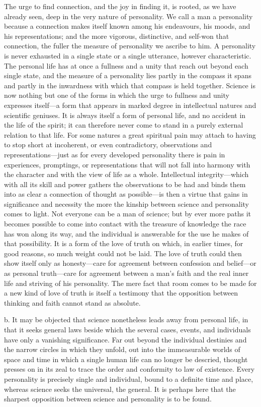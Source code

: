 \documentclass[12pt,a4paper]{article}
\newcommand{\opage}[1]{\marginnote{\footnotesize\textit{[#1]}}}
\begin{document}
The urge to find connection, and the joy in finding it, is rooted, as we have
already seen, deep in the very nature of personality. We call a man a personality
because a connection makes itself known among his endeavours, his moods, and his
representations; and the more vigorous, distinctive, and self-won that connection,
the fuller the measure of personality we ascribe to him. A personality is never
exhausted in a single state or a single utterance, however characteristic. The
personal life has at once a fullness and a unity that reach out beyond each single
state, and the measure of a personality lies partly in the compass it spans and
partly in the inwardness with which that compass is held together. Science is now
nothing but one of the forms in which the urge to fullness and unity expresses
itself---a form that appears in marked degree in intellectual natures and scientific
geniuses. It is always itself a form of personal life, and no accident in the life of
the spirit; it can therefore never come to stand in a purely external relation to
that life. For some natures a great spiritual pain may attach to having to stop short
at incoherent, or even contradictory, observations and representations---just as for
every developed personality there is pain in experiences, promptings, or
representations that will not fall into harmony with the character and with the view
of life as a whole. Intellectual integrity---which with all its skill and power
gathers the observations to be had and binds them into as clear a connection of
thought as possible---is then a virtue that gains in significance and necessity the
more the kinship between science and personality comes to light. Not everyone can be
a man of science; but by ever more paths \opage{41}it becomes possible to come into contact
with the treasure of knowledge the race has won along its way, and the individual is
answerable for the use he makes of that possibility. It is a form of the love of
truth on which, in earlier times, for good reasons, so much weight could not be laid.
The love of truth could then show itself only as honesty---care for agreement between
confession and belief---or as personal truth---care for agreement between a man's
faith and the real inner life and striving of his personality. The mere fact that
room comes to be made for a new kind of love of truth is itself a testimony that the
opposition between thinking and faith cannot stand as absolute.
\medskip

b. It may be objected that science nonetheless leads away from personal life, in that
it seeks general laws beside which the several cases, events, and individuals have
only a vanishing significance. Far out beyond the individual destinies and the narrow
circles in which they unfold, out into the immeasurable worlds of space and time in
which a single human life can no longer be descried, thought presses on in its zeal
to trace the order and conformity to law of existence. Every personality is precisely
single and individual, bound to a definite time and place, whereas science seeks the
universal, the general. It is perhaps here that the sharpest opposition between
science and personality is to be found.
\end{document}
